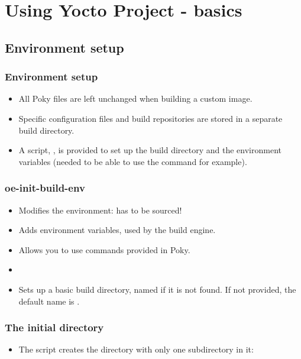\section{Using Yocto Project - basics}

\subsection{Environment setup}

\begin{frame}
  \frametitle{Environment setup}
  \begin{itemize}
    \item All Poky files are left unchanged when building a custom
      image.
    \item Specific configuration files and build repositories are
      stored in a separate build directory.
    \item A script, , is provided to set up
      the build directory and the environment variables (needed to be
      able to use the  command for example).
  \end{itemize}
\end{frame}

\begin{frame}
  \frametitle{oe-init-build-env}
  \begin{itemize}
    \item Modifies the environment: has to be sourced!
    \item Adds environment variables, used by the build engine.
    \item Allows you to use commands provided in Poky.
    \item {}
    \item Sets up a basic build directory, named  if it
      is not found. If not provided, the default name is .
  \end{itemize}
\end{frame}

\begin{frame}
  \frametitle{The initial  directory}
  \begin{itemize}
  \item The  script creates the 
    directory with only one subdirectory in it:
  \end{itemize}
\end{frame}

